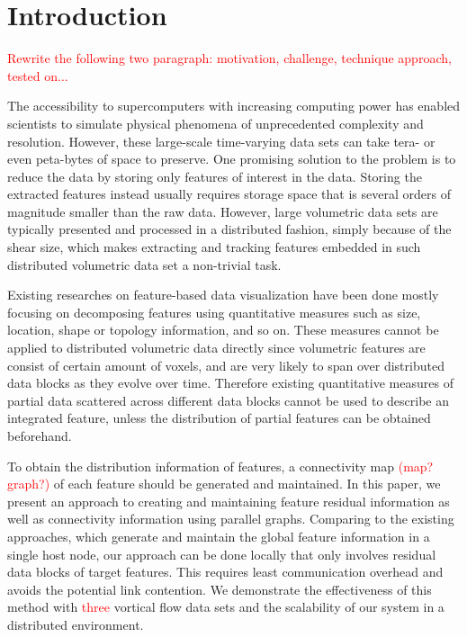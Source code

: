 \documentclass[10pt, conference, compsocconf]{IEEEtran}
\begin{document}
\section{Introduction}
\textcolor{red}{Rewrite the following two paragraph: motivation, challenge, technique approach, tested on...}

The accessibility to supercomputers with increasing computing power has enabled scientists to simulate physical phenomena of unprecedented complexity and resolution. However, these large-scale time-varying data sets can take tera- or even peta-bytes of space to preserve. One promising solution to the problem is to reduce the data by storing only features of interest in the data. Storing the extracted features instead usually requires storage space that is several orders of magnitude smaller than the raw data. However, large volumetric data sets are typically presented and processed in a distributed fashion, simply because of the shear size, which makes extracting and tracking features embedded in such distributed volumetric data set a non-trivial task. 

Existing researches on feature-based data visualization have been done mostly focusing on decomposing features using quantitative measures such as size, location, shape or topology information, and so on. These measures cannot be applied to distributed volumetric data directly since volumetric features are consist of certain amount of voxels, and are very likely to span over distributed data blocks as they evolve over time. Therefore existing quantitative measures of partial data scattered across different data blocks cannot be used to describe an integrated feature, unless the distribution of partial features can be obtained beforehand.

To obtain the distribution information of features, a connectivity map \textcolor{red}{(map? graph?)} of each feature should be generated and maintained. In this paper, we present an approach to creating and maintaining feature residual information as well as connectivity information using parallel graphs. Comparing to the existing approaches, which generate and maintain the global feature information in a single host node, our approach can be done locally that only involves residual data blocks of target features. This requires least communication overhead and avoids the potential link contention. We demonstrate the effectiveness of this method with \textcolor{red}{three} vortical flow data sets and the scalability of our system in a distributed environment.
\end{document}
